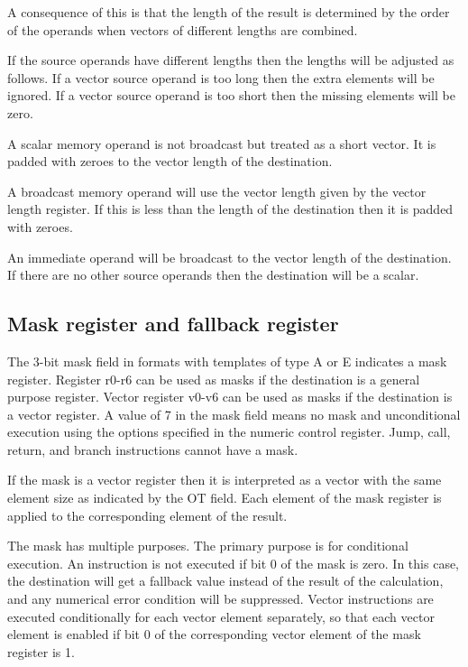 \documentclass[forwardcom.tex]{subfiles}
\begin{document}
A consequence of this is that the length of the result is determined by the order of the operands when vectors of different lengths are combined.
\vv

If the source operands have different lengths then the lengths will be adjusted as follows. If a vector source operand is too long then the extra elements will be ignored. If a vector source operand is too short then the missing elements will be zero.
\vv

A scalar memory operand is not broadcast but treated as a short vector. It is padded with zeroes to the vector length of the destination.
\vv

A broadcast memory operand will use the vector length given by the vector length register. If this is less than the length of the destination then it is padded with zeroes.
\vv

An immediate operand will be broadcast to the vector length of the destination. If there are no other source operands then the destination will be a scalar.
\vv

\subsection{Mask register and fallback register} \label{MaskAndFallback}
The 3-bit mask field in formats with templates of type A or E indicates a mask register. Register r0-r6 can be used as masks if the destination is a general purpose register. Vector register v0-v6 can be used as masks if the destination is a vector register. A value of 7 in the mask field means no mask and unconditional execution using the options specified in the numeric control register. Jump, call, return, and branch instructions cannot have a mask.
\vv

If the mask is a vector register then it is interpreted as a vector with the same element size as indicated by the OT field. Each element of the mask register is applied to the corresponding element of the result.
\vv

The mask has multiple purposes. The primary purpose is for conditional execution. An instruction is not executed if bit 0 of the mask is zero. In this case, the destination will get a fallback value instead of the result of the calculation, and any numerical error condition will be suppressed. Vector instructions are executed conditionally for each vector element separately, so that each vector element is enabled if bit 0 of the corresponding vector element of the mask register is 1.
\vv
\end{document}

